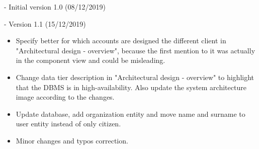 - Initial version 1.0 (08/12/2019)

- Version 1.1 (15/12/2019)
\begin{itemize}
	\item Specify better for which accounts are designed the different client in "Architectural design - overview", because the first mention to it was actually in the component view and could be misleading.
	\item Change data tier description in "Architectural design - overview" to highlight that the DBMS is in high-availability. Also update the system architecture image according to the changes.
	\item Update database, add organization entity and move name and surname to user entity instead of only citizen.
	\item Minor changes and typos correction.
\end{itemize}